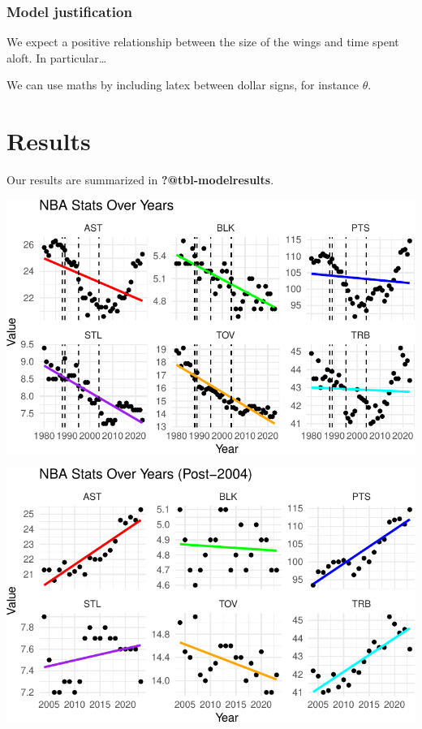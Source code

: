 \documentclass[
  letterpaper,
  DIV=11,
  numbers=noendperiod]{scrartcl}
\begin{document}
\subsubsection{Model justification}\label{model-justification}

We expect a positive relationship between the size of the wings and time
spent aloft. In particular\ldots{}

We can use maths by including latex between dollar signs, for instance
\(\theta\).

\section{Results}\label{results}

Our results are summarized in \textbf{?@tbl-modelresults}.

\includegraphics{paper_files/figure-pdf/unnamed-chunk-6-1.pdf}

\includegraphics{paper_files/figure-pdf/unnamed-chunk-7-1.pdf}
\end{document}
